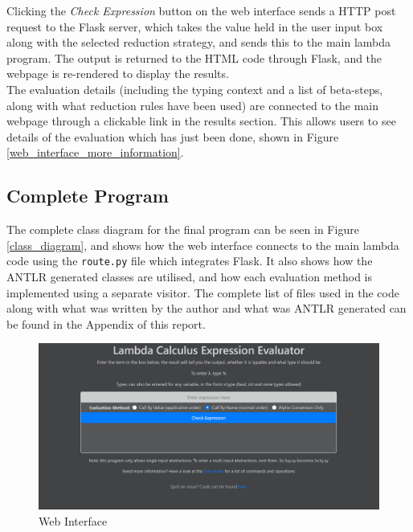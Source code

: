 \documentclass[a4paper,11pt]{report}
\begin{document}
Clicking the \textit{Check Expression} button on the web interface sends a HTTP post request to the Flask server, which takes the value held in the user input box along with the selected reduction strategy, and sends this to the main lambda program. The output is returned to the HTML code through Flask, and the webpage is re-rendered to display the results.\\

The evaluation details (including the typing context and a list of beta-steps, along with what reduction rules have been used) are connected to the main webpage through a clickable link in the results section. This allows users to see details of the evaluation which has just been done, shown in Figure \ref{web_interface_more_information}.

\subsection{Complete Program}
The complete class diagram for the final program can be seen in Figure \ref{class_diagram}, and shows how the web interface connects to the main lambda code using the \texttt{route.py} file which integrates Flask. It also shows how the ANTLR generated classes are utilised, and how each evaluation method is implemented using a separate visitor. The complete list of files used in the code along with what was written by the author and what was ANTLR generated can be found in the Appendix of this report.

\begin{figure}[p]
	\includegraphics[scale=0.4]{images/web_interface_no_input}
	\centering
	\caption{Web Interface}
	\label{web_interface_no_input}
\end{figure}
\end{document}
